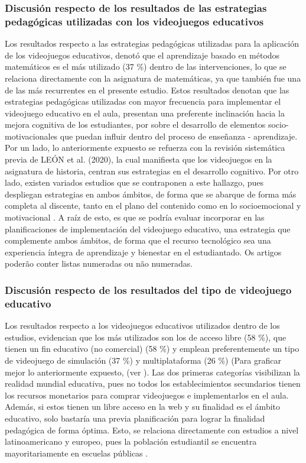 \documentclass[spanish]{textolivre}
\begin{document}
\subsubsection{Discusión respecto de los resultados de las estrategias pedagógicas utilizadas con los videojuegos educativos}
Los resultados respecto a las estrategias pedagógicas utilizadas para la aplicación de los videojuegos educativos, denotó que el aprendizaje basado en métodos matemáticos es el más utilizado (37 \%) dentro de las intervenciones, lo que se relaciona directamente con la asignatura de matemáticas, ya que también fue una de las más recurrentes en el presente estudio. Estos resultados denotan que las estrategias pedagógicas utilizadas con mayor frecuencia para implementar el videojuego educativo en el aula, presentan una preferente inclinación hacia la mejora cognitiva de los estudiantes, por sobre el desarrollo de elementos socio-motivacionales que puedan influir dentro del proceso de enseñanza - aprendizaje. Por un lado, lo anteriormente expuesto se refuerza con la revisión sistemática previa de LEÓN et al. (2020), la cual manifiesta que los videojuegos en la asignatura de historia, centran sus estrategias en el desarrollo cognitivo. Por otro lado, existen variados estudios que se contraponen a este hallazgo, pues despliegan estrategias en ambos ámbitos, de forma que se abarque de forma más completa al discente, tanto en el plano del contenido como en lo socioemocional y motivacional \cite{araujo_exergames_2017,torres-toukoumidis_desarrollo_2016,mendez_uso_2021,prieto_andreu_revision_2021}.  A raíz de esto, es que se podría evaluar incorporar en las planificaciones de implementación del videojuego educativo, una estrategia que complemente ambos ámbitos, de forma que el recurso tecnológico sea una experiencia íntegra de aprendizaje y bienestar en el estudiantado. 
Os artigos poderão conter listas numeradas ou não numeradas.

\subsubsection{Discusión respecto de los resultados del tipo de videojuego educativo}\label{sec-figuras-tabelas}
Los resultados respecto a los videojuegos educativos utilizados dentro de los estudios, evidencian que los más utilizados son los de acceso libre (58 \%), que tienen un fin educativo (no comercial) (58 \%) y emplean preferentemente un tipo de videojuego de simulación (37 \%) y multiplataforma (26 \%) (Para graficar mejor lo anteriormente expuesto, (ver ). Las dos primeras categorías visibilizan la realidad mundial educativa, pues no todos los establecimientos secundarios tienen los recursos monetarios para comprar videojuegos e implementarlos en el aula. Además, si estos tienen un libre acceso en la web y su finalidad es el ámbito educativo, solo bastaría una previa planificación para lograr la finalidad pedagógica de forma óptima. Esto, se relaciona directamente con estudios a nivel latinoamericano y europeo, pues la población estudiantil se encuentra mayoritariamente en escuelas públicas \cite{murillo_segregacion_2017}. 
\end{document}
